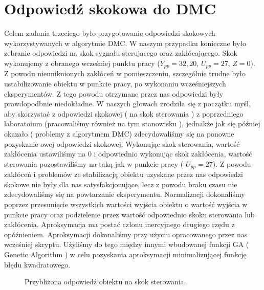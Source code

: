 \chapter{Odpowiedź skokowa do DMC}
Celem zadania trzeciego było przygotowanie odpowiedzi skokowych wykorzystywanych
w algorytmie DMC. W naszym przypadku konieczne było zebranie odpowiedzi na skok
sygnału sterującego oraz zakłócającego. Skok wykonujemy z obranego wcześniej punktu
pracy ($Y_{pp} = 32,20$, $U_{pp} = 27$, $Z = 0$). Z powodu nieuniknionych zakłóceń
w pomieszczeniu, szczególnie trudne było ustabilizowanie obiektu w punkcie pracy,
po wykonaniu wcześniejszych eksperymentów. Z tego powodu otrzymane przez nas odpowiedzi
były prawdopodbnie niedokładne. W naszych głowach zrodziła się z początku myśl,
aby skorzystać z odpowiedzi skokowej ( na skok sterowania ) z poprzedniego laboratoium
(pracowaliśmy również na tym stanowisku ), jednakże jak się później okazało
( problemy z algorytmem DMC) zdecydowaliśmy się na ponowne pozyskanie owej odpowiedzi skokowej.
Wykonując skok sterowania, wartość zakłócenia ustawiliśmy na 0 i odpowiednio
wykonując skok zakłócenia, wartość sterowania pozostawiliśmy na taką jak w punkcie
pracy ( $U_{pp} = 27$). Z powodu zakłóceń i problemów ze stabilizacją obiektu uzyskane
przez nas odpowiedzi skokowe nie były dla nas satysfakcjonujące, lecz z powodu braku
czasu nie zdecydowaliśmy się na powtarzanie eksperymentu. Normalizacji dokonaliśmy
poprzez przesunięcie wszystkich wartości wyjścia obiektu o wartość wyjścia w punkcie
pracy oraz podzielenie przez wartość odpowiednio skoku sterowania lub zakłócenia.
Aproksymacja ma postać członu inercyjnego drugiego rzędu z opóźnieniem.
Aproksymacji dokonaliśmy przy użyciu opracowanego przez nas wcześniej skryptu.
Użyliśmy do tego między innymi wbudowanej funkcji GA ( Genetic Algorithm ) w celu
pozyskania aproksymacji minimalizującej funkcję błędu kwadratowego.

\begin{figure}[tb]
\centering
{}
\caption{Przybliżona odpowiedź obiektu na skok sterowania.}
\label{fig:skok_zak}
\end{figure}


